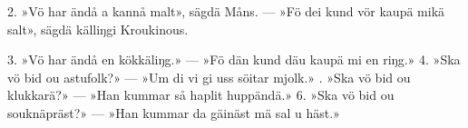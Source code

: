2.  »Vö har ändå a kannå malt», sägdä Måns. —
    »Fö dei kund vör kaupä mikä salt», sägdä källiŋgi Kroukinous.
\setlength{\columnsep}{0.2cm}
\begin{multicols}{2}
3.  »Vö har ändå en kökkäliŋg.» —
    »Fö dän kund däu kaupä mi en riŋg.»
4.  »Ska vö bid ou astufolk?» —
    »Um di vi gi uss söitar mjolk.»
\vfill{}.  »Ska vö bid ou klukkarä?» —
    »Han kummar så haplit huppändä.»
6.  »Ska vö bid ou souknäpräst?» —
    »Han kummar da gäinäst mä sal u häst.»
\end{multicols}
